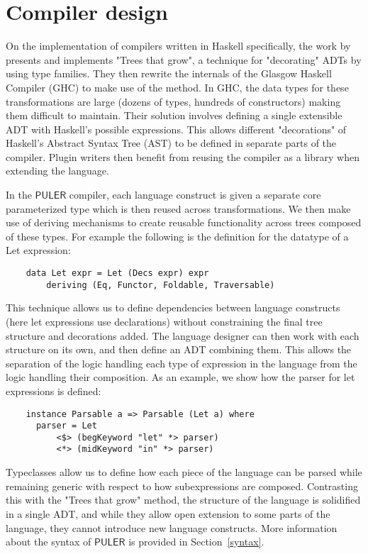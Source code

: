 \documentclass{article} %
\newcommand{\PULER}{\mathsf{PULER}}
\begin{document}
\section{Compiler design}\label{compiler}
    On the implementation of compilers written in Haskell specifically, the work by \citet{najd2017trees} presents and implements "Trees that grow", a technique for "decorating" ADTs by using type families.
    They then rewrite the internals of the Glasgow Haskell Compiler (GHC) \cite{GHC} to make use of the method.
    In GHC, the data types for these transformations are large (dozens of types, hundreds of constructors) making them difficult to maintain.
    Their solution involves defining a single extensible ADT with Haskell's possible expressions.
    This allows different "decorations" of Haskell's Abstract Syntax Tree (AST) to be defined in separate parts of the compiler.
    Plugin writers then benefit from reusing the compiler as a library when extending the language.
    
    In the $\PULER$ compiler, each language construct is given a separate core parameterized type which is then reused across transformations.
    We then make use of deriving mechanisms to create reusable functionality across trees composed of these types.
    For example the following is the definition for the datatype of a Let expression:
    \begin{verbatim}
    data Let expr = Let (Decs expr) expr
        deriving (Eq, Functor, Foldable, Traversable)
    \end{verbatim}
    This technique allows us to define dependencies between language constructs (here let expressions use declarations) without constraining the final tree structure and decorations added.
    The language designer can then work with each structure on its own, and then define an ADT combining them.
    This allows the separation of the logic handling each type of expression in the language from the logic handling their composition.
    As an example, we show how the parser for let expressions is defined:
    \begin{verbatim}
    instance Parsable a => Parsable (Let a) where
      parser = Let
          <$> (begKeyword "let" *> parser)
          <*> (midKeyword "in" *> parser)
    \end{verbatim}
    Typeclasses allow us to define how each piece of the language can be parsed while remaining generic with respect to how subexpressions are composed.
    Contrasting this with the "Trees that grow" method, the structure of the language is solidified in a single ADT, and while they allow open extension to some parts of the language, they cannot introduce new language constructs.
    More information about the syntax of $\PULER$ is provided in Section~\ref{syntax}.
    
\end{document}
